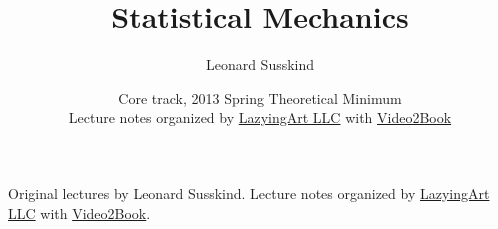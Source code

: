 \documentclass[11pt,oneside]{book}
\begin{document}
\frontmatter

\title{Statistical Mechanics}
\author{Leonard Susskind}
\date{Core track, 2013 Spring Theoretical Minimum \\ Lecture notes organized by \href{https://lazying.art}{LazyingArt LLC} with \href{https://github.com/lachlanchen/Video2Book}{Video2Book}}
\maketitle
\begin{center}
\small Original lectures by Leonard Susskind. Lecture notes organized by \href{https://lazying.art}{LazyingArt LLC} with \href{https://github.com/lachlanchen/Video2Book}{Video2Book}.
\end{center}
\clearpage
\tableofcontents
\mainmatter










\end{document}
